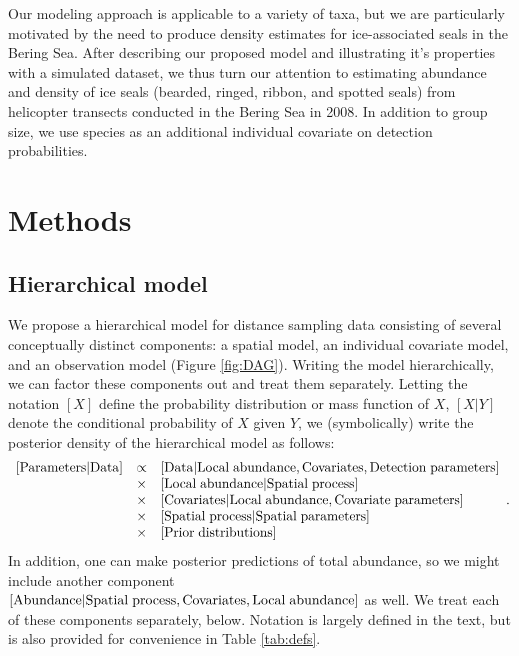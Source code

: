 \documentclass[10pt]{article}
\begin{document}
Our modeling approach is applicable to a variety of taxa, but we are particularly motivated by the need to produce density estimates for ice-associated seals in the Bering Sea.  After describing our proposed model and illustrating it's properties with a simulated dataset, we thus turn our attention to estimating abundance and density of ice seals (bearded, ringed, ribbon, and spotted seals) from helicopter transects conducted in the Bering Sea in 2008.  In addition to group size, we use species as an additional individual covariate on detection probabilities.


\section*{Methods}

\subsection*{Hierarchical model}

We propose a hierarchical model for distance sampling data consisting of several conceptually distinct components: a spatial model, an individual covariate model, and an observation model (Figure \ref{fig:DAG}).  Writing the model hierarchically, we can factor these components out
and treat them separately.  Letting the notation $[X]$ define the probability distribution or mass function of $X$, $[X|Y]$ denote the conditional probability of $X$ given $Y$, we (symbolically) write the posterior density of the hierarchical model as follows:
$$
\begin{array}{lll}
[ {\rm Parameters} | {\rm Data}] & \propto & [{\rm Data | Local \hspace{1mm} abundance, Covariates, Detection \hspace{1mm} parameters}]\\
& \times & [{\rm Local \hspace{1mm} abundance | Spatial \hspace{1mm} process}]\\
& \times & [{\rm Covariates|Local \hspace{1mm} abundance, Covariate \hspace{1mm} parameters}]\\
& \times & [{\rm Spatial \hspace{1mm} process | Spatial\hspace{1mm}  parameters}]\\
& \times & [{\rm Prior \hspace{1mm} distributions}]
\end{array}.
$$
In addition, one can make posterior predictions of total abundance, so we might include another component
$[{\rm Abundance |Spatial \hspace{1mm} process,Covariates,Local \hspace{1mm} abundance }]$ as well.
We treat each of these components separately, below.  Notation is largely defined in the text, but is also provided for convenience in Table \ref{tab:defs}.
\end{document}
